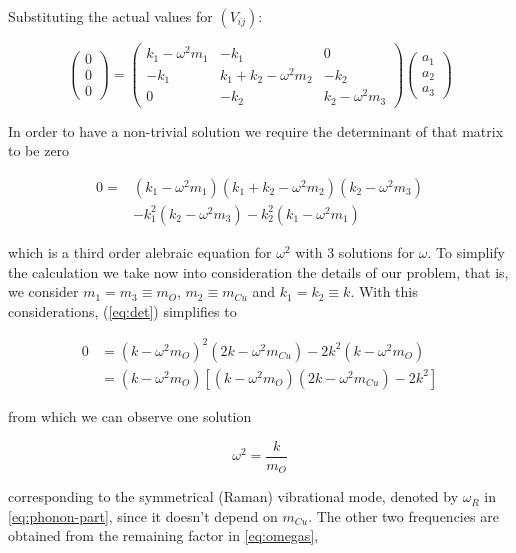 Substituting the actual values for $(V_{ij})$:

\begin{equation}
\left( \begin{array}{c} 0\\ 0\\ 0 \end{array}\right) 
= \left( \begin{array}{ccc} k_1-\omega^2m_1 & -k_1 & 0 \\ -k_1 & k_1+k_2-\omega^2m_2 & -k_2 \\ 0 & -k_2 & k_2-\omega^2m_3 \end{array}\right) \left(\begin{array}{c} a_1 \\ a_2 \\ a_3 \end{array}\right)
\end{equation}

In order to have a non-trivial solution we require the determinant of that matrix to be zero

\begin{equation}\label{eq:det}
\begin{split}
0 = & (k_1-\omega^2m_1)(k_1+k_2-\omega^2m_2)(k_2-\omega^2m_3) \\
    & -k_1^2(k_2-\omega^2m_3)-k_2^2(k_1-\omega^2m_1)
\end{split}
\end{equation}

\noindent which is a third order alebraic equation for $\omega^2$ with 3 solutions for $\omega$.
To simplify the calculation we take now into consideration the details of our problem, that is, we consider $m_1 = m_3 \equiv m_O$, $m_2 \equiv m_{Cu}$ and $k_1 = k_2 \equiv k$. 
With this considerations, (\ref{eq:det}) simplifies to

\begin{align}\label{eq:omegas}
0 & = (k-\omega^2m_O)^2(2k-\omega^2m_{Cu})-2k^2(k-\omega^2m_O) \\
  & = (k-\omega^2m_O)[(k-\omega^2m_O)(2k-\omega^2m_{Cu})-2k^2]
\end{align}

\noindent from which we can observe one solution

\begin{equation}
\omega^2= \frac{k}{m_O}
\end{equation}

\noindent corresponding to the symmetrical (Raman) vibrational mode, denoted by $\omega_{R}$ in \ref{eq:phonon-part}, since it doesn't depend on $m_{Cu}$.
The other two frequencies are obtained from the remaining factor in \ref{eq:omegas},

